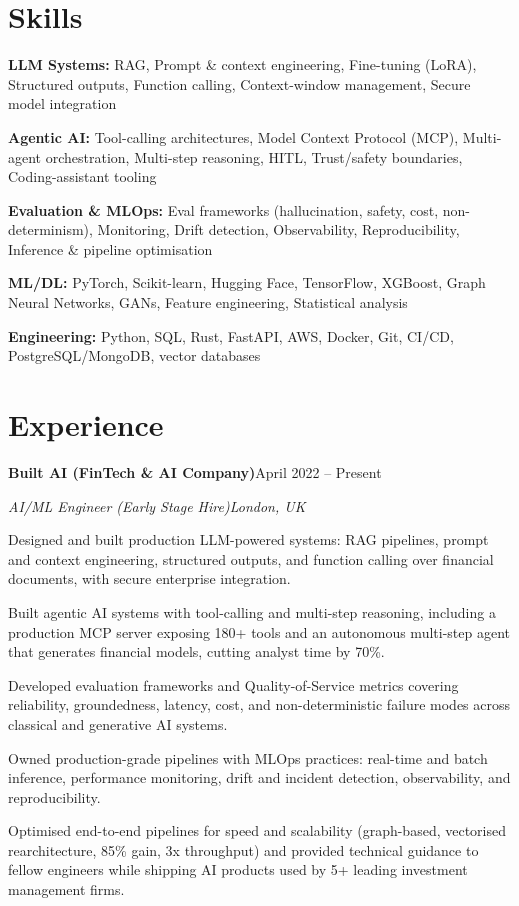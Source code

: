 \documentclass[10pt,a4paper]{article}
\newcommand{\entry}[4]{%
  {\color{company}\bfseries #1}\hfill {\color{muted}#2}\par
  \vspace{1pt}
  {\itshape #3}\hfill {\color{muted}\itshape #4}\par
  \vspace{3pt}%
}
\begin{document}
\section{Skills}
\begin{tight}
  \item[\textcolor{accent}{\small$\bullet$}] \textbf{LLM Systems:} RAG, Prompt \& context engineering, Fine-tuning (LoRA), Structured outputs, Function calling, Context-window management, Secure model integration
  \item[\textcolor{accent}{\small$\bullet$}] \textbf{Agentic AI:} Tool-calling architectures, Model Context Protocol (MCP), Multi-agent orchestration, Multi-step reasoning, HITL, Trust/safety boundaries, Coding-assistant tooling
  \item[\textcolor{accent}{\small$\bullet$}] \textbf{Evaluation \& MLOps:} Eval frameworks (hallucination, safety, cost, non-determinism), Monitoring, Drift detection, Observability, Reproducibility, Inference \& pipeline optimisation
  \item[\textcolor{accent}{\small$\bullet$}] \textbf{ML/DL:} PyTorch, Scikit-learn, Hugging Face, TensorFlow, XGBoost, Graph Neural Networks, GANs, Feature engineering, Statistical analysis
  \item[\textcolor{accent}{\small$\bullet$}] \textbf{Engineering:} Python, SQL, Rust, FastAPI, AWS, Docker, Git, CI/CD, PostgreSQL/MongoDB, vector databases
\end{tight}

\section{Experience}
\entry{Built AI (FinTech \& AI Company)}{April 2022 -- Present}{AI/ML Engineer (Early Stage Hire)}{London, UK}
\begin{tight}
  \item Designed and built production LLM-powered systems: RAG pipelines, prompt and context engineering, structured outputs, and function calling over financial documents, with secure enterprise integration.
  \item Built agentic AI systems with tool-calling and multi-step reasoning, including a production MCP server exposing 180+ tools and an autonomous multi-step agent that generates financial models, cutting analyst time by 70\%.
  \item Developed evaluation frameworks and Quality-of-Service metrics covering reliability, groundedness, latency, cost, and non-deterministic failure modes across classical and generative AI systems.
  \item Owned production-grade pipelines with MLOps practices: real-time and batch inference, performance monitoring, drift and incident detection, observability, and reproducibility.
  \item Optimised end-to-end pipelines for speed and scalability (graph-based, vectorised rearchitecture, 85\% gain, 3x throughput) and provided technical guidance to fellow engineers while shipping AI products used by 5+ leading investment management firms.
\end{tight}
\end{document}
